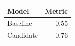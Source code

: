 \begin{tabular}{lr}
\hline
Model & Metric \\
\hline
Baseline & 0.55 \\
Candidate & 0.76 \\
\hline
\end{tabular}
